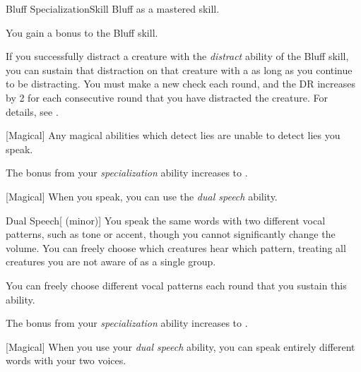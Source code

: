     \begin{feat}{Bluff Specialization}{Skill}
        \featpre Bluff as a mastered skill.

         You gain a  bonus to the Bluff skill.

         If you successfully distract a creature with the \textit{distract} ability of the Bluff skill, you can sustain that distraction on that creature with a  as long as you continue to be distracting.
        You must make a new check each round, and the DR increases by 2 for each consecutive round that you have distracted the creature.
        For details, see .

        [Magical] Any magical abilities which detect lies are unable to detect lies you speak.

         The bonus from your \textit{specialization} ability increases to .

        [Magical] When you speak, you can use the \textit{dual speech} ability.
        \begin{apability}{Dual Speech}[ (minor)]
            You speak the same words with two different vocal patterns, such as tone or accent, though you cannot significantly change the volume.
            You can freely choose which creatures hear which pattern, treating all creatures you are not aware of as a single group.

            You can freely choose different vocal patterns each round that you sustain this ability.
        \end{apability}

         The bonus from your \textit{specialization} ability increases to .

        [Magical] When you use your \textit{dual speech} ability, you can speak entirely different words with your two voices.
    \end{feat}

